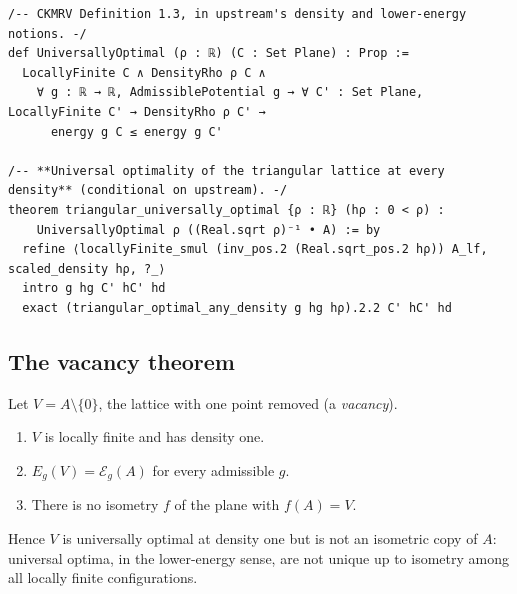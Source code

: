 \begin{leanbox}
\begin{lstlisting}[language=Lean]
/-- CKMRV Definition 1.3, in upstream's density and lower-energy notions. -/
def UniversallyOptimal (ρ : ℝ) (C : Set Plane) : Prop :=
  LocallyFinite C ∧ DensityRho ρ C ∧
    ∀ g : ℝ → ℝ, AdmissiblePotential g → ∀ C' : Set Plane, LocallyFinite C' → DensityRho ρ C' →
      energy g C ≤ energy g C'

/-- **Universal optimality of the triangular lattice at every density** (conditional on upstream). -/
theorem triangular_universally_optimal {ρ : ℝ} (hρ : 0 < ρ) :
    UniversallyOptimal ρ ((Real.sqrt ρ)⁻¹ • A) := by
  refine ⟨locallyFinite_smul (inv_pos.2 (Real.sqrt_pos.2 hρ)) A_lf, scaled_density hρ, ?_⟩
  intro g hg C' hC' hd
  exact (triangular_optimal_any_density g hg hρ).2.2 C' hC' hd
\end{lstlisting}
\end{leanbox}

\subsection{The vacancy theorem}
Let $V=A\setminus\{0\}$, the lattice with one point removed (a \emph{vacancy}).

\begin{theorem}[Vacancy]\label{ch2:thm:vac}
\begin{enumerate}[label=(\roman*)]
\item $V$ is locally finite and has density one.
\item $E_g(V)=\mathcal{E}_g(A)$ for every admissible $g$.
\item There is no isometry $f$ of the plane with $f(A)=V$.
\end{enumerate}
Hence $V$ is universally optimal at density one but is not an isometric copy of $A$: universal optima, in the
lower-energy sense, are not unique up to isometry among all locally finite configurations.
\end{theorem}

